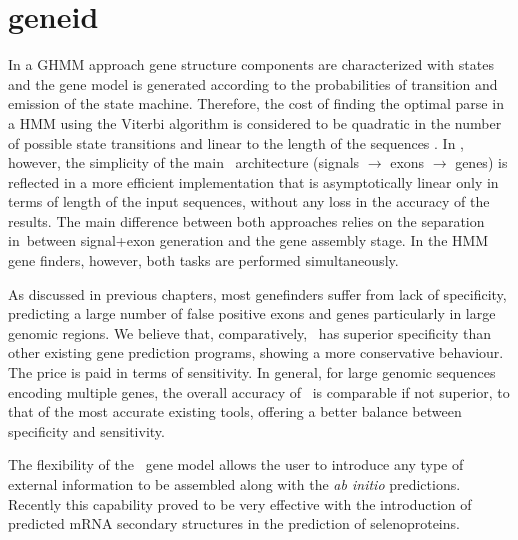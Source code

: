 \section{geneid}


In a GHMM approach gene structure components are characterized with
states and the gene model is generated according to the probabilities
of transition and emission of the state machine. Therefore, the cost
of finding the optimal parse in a HMM using the Viterbi algorithm is
considered to be quadratic in the number of possible state transitions
and linear to the length of the sequences \cite{burge:1997a}.  In
\geneid, however, the simplicity of the main \geneid~architecture
(signals $\rightarrow$ exons $\rightarrow$ genes) is reflected in a
more efficient implementation that is asymptotically linear only in
terms of length of the input sequences, without any loss in the
accuracy of the results. The main difference between both approaches
relies on the separation in\geneid\ between signal+exon generation and
the gene assembly stage.  In the HMM gene finders, however, both tasks
are performed simultaneously.


As discussed in previous chapters, most genefinders suffer from lack
of specificity, predicting a large number of false positive exons and
genes particularly in large genomic regions. We believe that,
comparatively, \geneid\ has superior specificity than other existing
gene prediction programs, showing a more conservative behaviour. The
price is paid in terms of sensitivity. In general, for large genomic
sequences encoding multiple genes, the overall accuracy of \geneid\ is
comparable if not superior, to that of the most accurate existing
tools, offering a better balance between specificity and sensitivity.



The flexibility of the \geneid\ gene model allows the user to introduce
any type of external information to be assembled along with the
\textit{ab initio} predictions. Recently this capability proved to be
very effective with the introduction of predicted mRNA secondary
structures in the prediction of selenoproteins. 


